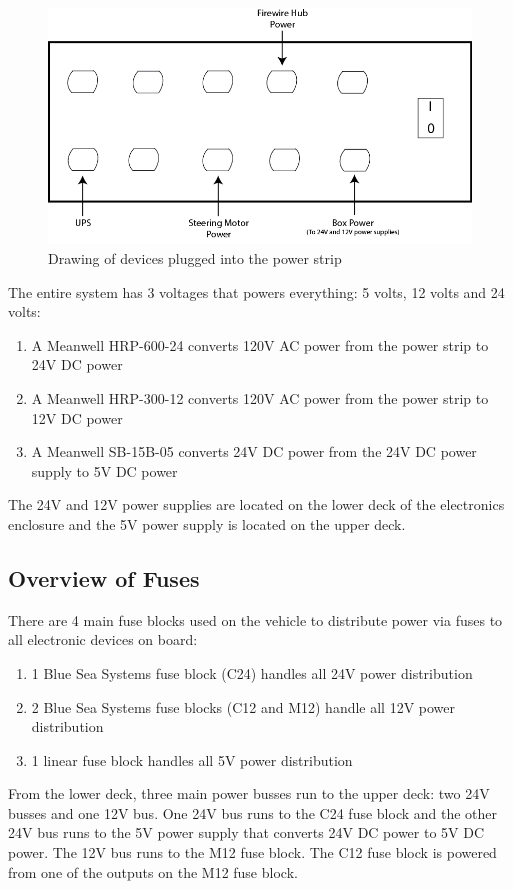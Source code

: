 \begin{figure}[h!]
\centering
\includegraphics[scale=.6]{Photos/PowerStrip_Drawing.jpg}
\caption{Drawing of devices plugged into the power strip}
\label{fig:powerstripdrawing}
\end{figure} 

\noindent The entire system has 3 voltages that powers everything: 5 volts, 12 volts and 24 volts:
\begin{enumerate}
\item A Meanwell HRP-600-24 converts 120V AC power from the power strip to 24V DC power
\item A Meanwell HRP-300-12 converts 120V AC power from the power strip to 12V DC power
\item A Meanwell SB-15B-05 converts 24V DC power from the 24V DC power supply to 5V DC power
\end{enumerate}
%
The 24V and 12V power supplies are located on the lower deck of the electronics enclosure and the 5V power supply is located on the upper deck.

\newpage 

\subsection{Overview of Fuses}
There are 4 main fuse blocks used on the vehicle to distribute power via fuses to all electronic devices on board:
\begin{enumerate}
\item 1 Blue Sea Systems fuse block (C24) handles all 24V power distribution
\item 2 Blue Sea Systems fuse blocks (C12 and M12) handle all 12V power distribution
\item 1 linear fuse block handles all 5V power distribution 
\end{enumerate}
%
From the lower deck, three main power busses run to the upper deck: two 24V busses and one 12V bus. One 24V bus runs to the C24 fuse block and the other 24V bus runs to the 5V power supply that converts 24V DC power to 5V DC power. The 12V bus runs to the M12 fuse block. The C12 fuse block is powered from one of the outputs on the M12 fuse block.
%
